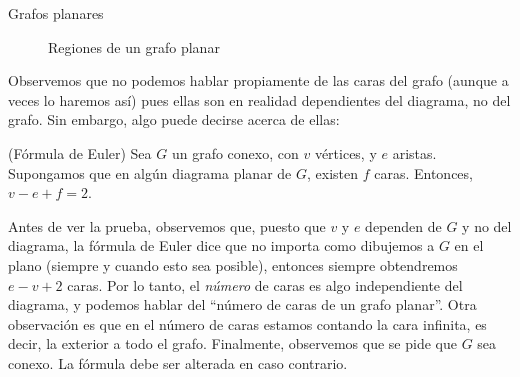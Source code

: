 \begin{section}{Grafos planares}
\begin{figure}[h]
    \begin{center}
    \end{center}
    \caption{Regiones de un grafo planar} \label{fA4.4}
\end{figure}


Observemos que no podemos hablar propiamente de las caras del grafo (aunque a veces lo haremos así) pues ellas son en realidad dependientes del diagrama, no del grafo. Sin embargo, algo puede decirse acerca de ellas:

\begin{teorema}\label{tA4.1} (Fórmula de Euler) Sea $G$ un grafo conexo, con $v$ vértices, y $e$ aristas. Supongamos que en algún diagrama planar de $G$, existen $f$ caras. Entonces, $v-e+f=2$.
\end{teorema}

Antes de ver la prueba, observemos que, puesto que $v$ y $e$ dependen de $G$ y no del diagrama, la fórmula de Euler dice que no importa como dibujemos a $G$ en el plano (siempre y cuando esto sea posible), entonces siempre obtendremos $e-v+2$ caras. Por lo tanto, el \textit{número} de caras es algo independiente del
diagrama, y podemos hablar del ``número de caras de un grafo planar''. Otra observación es que en el número de caras estamos contando la cara infinita, es decir, la exterior a todo el grafo. Finalmente, observemos que se pide que $G$ sea conexo. La fórmula debe ser alterada en caso contrario.


\end{section}
